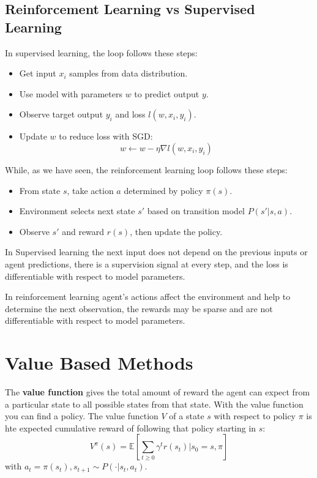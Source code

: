 \subsection{Reinforcement Learning vs Supervised Learning}
In supervised learning, the loop follows these steps:
\begin{itemize}
    \item Get input \(x_i\) samples from data distribution.
    \item Use model with parameters \(w\) to predict output \(y\).
    \item Observe target output \(y_i\) and loss \(l(w,x_i,y_i)\).
    \item Update \(w\) to reduce loss with SGD:
    \begin{equation}
        w \gets w - \eta \nabla l (w, x_i, y_i)
    \end{equation}
\end{itemize}
While, as we have seen, the reinforcement learning loop follows these steps:
\begin{itemize}
    \item From state \(s\), take action \(a\) determined by policy \(\pi(s)\).
    \item Environment selects next state \(s'\) based on transition model \(P(s' | s,a)\).
    \item Observe \(s'\) and reward \(r(s)\), then update the policy.
\end{itemize}

In Supervised learning the next input does not depend on the previous inputs or agent predictions, there is a supervision signal at every step, and the loss is differentiable with respect to model parameters. 

In reinforcement learning agent's actions affect the environment and help to determine the next observation, the rewards may be sparse and are not differentiable with respect to model parameters.

\section{Value Based Methods}
The \textbf{value function} gives the total amount of reward the agent can expect from a particular state to all possible states from that state. With the value function you can find a policy. The value function \(V\) of a state \(s\) with respect to policy \(\pi\) is hte expected cumulative reward of following that policy starting in \(s\):
\begin{equation}
    V^\pi (s) = \mathbb{E} \left[
        \sum_{t \geq 0} \gamma^t r(s_t) | s_0 = s, \pi
    \right]
\end{equation}
with \(a_t = \pi(s_t), s_{t+1} \sim P( \cdot | s_t, a_t)\).

